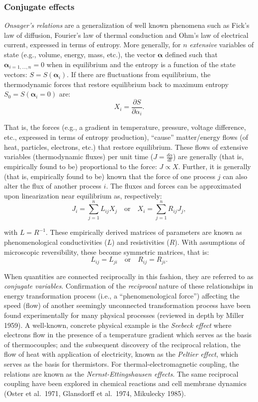 \documentclass[11pt,letterpaper,]{paper}
\begin{document}
\subsubsection{Conjugate effects}\label{conjugate-effects}

\emph{Onsager's relations} are a generalization of well known phenomena
such as Fick's law of diffusion, Fourier's law of thermal conduction and
Ohm's law of electrical current, expressed in terms of entropy. More
generally, for \(n\) \emph{extensive} variables of state (e.g., volume,
energy, mass, etc.), the vector \(\boldsymbol{\alpha}\) defined such
that \(\boldsymbol{\alpha}_{i=1, \dots, n} = 0\) when in equilibrium and
the entropy is a function of the state vectors:
\(S=S(\boldsymbol{\alpha}_i)\). If there are fluctuations from
equilibrium, the thermodynamic forces that restore equilibrium back to
maximum entropy \(S_0 = S(\boldsymbol{\alpha}_i = 0)\) are:
\[X_i = \frac{\partial S}{\partial \alpha_i}.\]

That is, the forces (e.g., a gradient in temperature, pressure, voltage
difference, etc., expressed in terms of entropy production), ``cause''
matter/energy flows (of heat, particles, electrons, etc.) that restore
equilibrium. These flows of extensive variables (thermodynamic fluxes)
per unit time (\(J = \frac{d\alpha}{dt}\)) are generally (that is,
empirically found to be) proportional to the force: \(J \propto X\).
Further, it is generally (that is, empirically found to be) known that
the force of one process \(j\) can also alter the flux of another
process \(i\). The fluxes and forces can be approximated upon
linearization near equilibrium as, respectively:
\[J_i = \sum_{j=1}^{n} L_{ij} X_j \quad \text{or} \quad X_i= \sum_{j=1}^{n} R_{ij} J_j,\]

with \(L = R^{-1}\). These empirically derived matrices of parameters
are known as phenomenological conductivities (\(L\)) and resistivities
(\(R\)). With assumptions of microscopic reversibility, these become
symmetric matrices, that is:
\[L_{ij} = L_{ji} \quad \text{or} \quad R_{ij} = R_{ji}.\]

When quantities are connected reciprocally in this fashion, they are
referred to as \emph{conjugate variables}. Confirmation of the
\emph{reciprocal} nature of these relationships in energy transformation
process (i.e., a ``phenomenological force'') affecting the speed (flow)
of another seemingly unconnected transformation process have been found
experimentally for many physical processes (reviewed in depth by Miller
1959). A well-known, concrete physical example is the \emph{Seebeck
effect} where electrons flow in the presence of a temperature gradient
which serves as the basis of thermocouples; and the subsequent discovery
of the reciprocal relation, the flow of heat with application of
electricity, known as the \emph{Peltier effect}, which serves as the
basis for thermistors. For thermal-electromagnetic coupling, the
relations are known as the \emph{Nernst-Ettingshausen effects}. The same
reciprocal coupling have been explored in chemical reactions and cell
membrane dynamics (Oster et al.~1971, Glansdorff et al.~1974, Mikulecky
1985).
\end{document}
